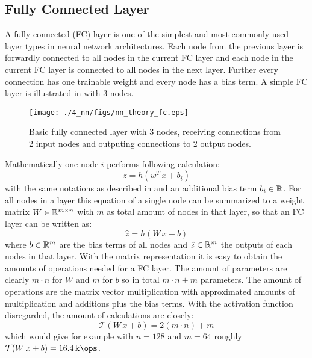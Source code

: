 \subsection{Fully Connected Layer}
A fully connected (FC) layer is one of the simplest and most commonly used layer types in neural network architectures.
Each node from the previous layer is forwardly connected to all nodes in the current FC layer and each node in the current FC layer is connected to all nodes in the next layer.
Further every connection has one trainable weight and every node has a bias term.
A simple FC layer is illustrated in  with 3 nodes.
\begin{figure}[!ht]
  \centering
    \texttt{[image: ./4\_nn/figs/nn\_theory\_fc.eps]}
  \caption{Basic fully connected layer with 3 nodes, receiving connections from 2 input nodes and outputing connections to 2 output nodes.}
  \label{fig:nn_theory_fc}
\end{figure}
\FloatBarrier
\noindent
Mathematically one node $i$ performs following calculation:
\begin{equation}
  z = h(w^T \, x + b_i)
\end{equation}
with the same notations as described in  and an additional bias term $b_i \in \mathbb{R}$.
For all nodes in a layer this equation of a single node can be summarized to a weight matrix $W \in \mathbb{R}^{m \times n}$ with $m$ as total amount of nodes in that layer, so that an FC layer can be written as:
\begin{equation}
  \hat{z} = h(W \, x + b)
\end{equation}
where $b \in \mathbb{R}^m$ are the bias terms of all nodes and $\hat{z} \in \mathbb{R}^m$ the outputs of each nodes in that layer.
With the matrix representation it is easy to obtain the amounts of operations needed for a FC layer.
The amount of parameters are clearly $m \cdot n$ for $W$ and $m$ for $b$ so in total $m \cdot n + m$ parameters.
The amount of operations are the matrix vector multiplication with approximated amounts of multiplication and additions plus the bias terms.
With the activation function disregarded, the amount of calculations are closely:
\begin{equation} 
  \mathcal{T}(W \, x + b) = 2 (m \cdot n) + m
\end{equation}
which would give for example with $n = 128$ and $m = 64$ roughly $\mathcal{T}(W \, x + b) = \SI{16.4}{\kilo\ops}$.



